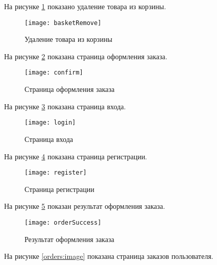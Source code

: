 На рисунке \ref{basketRemove:image} показано удаление товара из корзины.

\begin{figure}[H]
	\texttt{[image: basketRemove]}
	\caption{Удаление товара из корзины}
	\label{basketRemove:image}
\end{figure}

На рисунке \ref{confirm:image} показана страница оформления заказа.

\begin{figure}[H]
	\texttt{[image: confirm]}
	\caption{Страница оформления заказа}
	\label{confirm:image}
\end{figure}

На рисунке \ref{login:image} показана страница входа.

\begin{figure}[H]
	\texttt{[image: login]}
	\caption{Страница входа}
	\label{login:image}
\end{figure}

На рисунке \ref{register:image} показана страница регистрации.

\begin{figure}[H]
	\texttt{[image: register]}
	\caption{Страница регистрации}
	\label{register:image}
\end{figure}

На рисунке \ref{orderSuccess:image} показан результат оформления заказа.

\begin{figure}[H]
	\texttt{[image: orderSuccess]}
	\caption{Результат оформления заказа}
	\label{orderSuccess:image}
\end{figure}

На рисунке \ref{orders:image} показана страница заказов пользователя.

